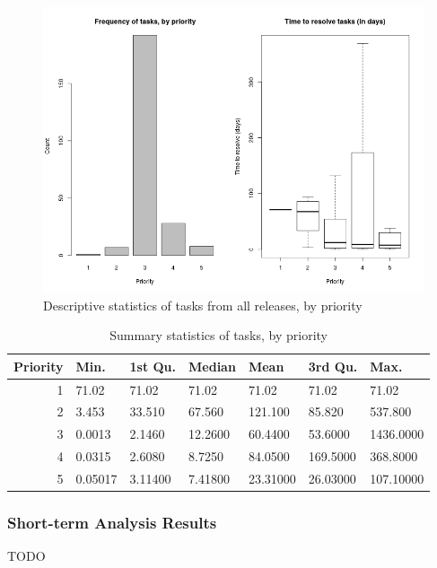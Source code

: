 \documentclass[a4paper]{scrartcl}
\begin{document}
\begin{figure}
\begin{center}
\includegraphics[width=6in]{exploratory_results/mongodb_allreleases/tasks}
\caption{Descriptive statistics of tasks from all releases, by priority}
\label{fig:all_tasks}
\end{center}
\end{figure}

\begin{table}[h!]
\caption{Summary statistics of tasks, by priority}
\centering
\begin{tabular}{ r | l | l | l | l |  l | l }
\hline
Priority & Min. & 1st Qu. & Median & Mean & 3rd Qu. & Max. \\
\hline\hline
1 & 71.02 & 71.02 & 71.02 & 71.02 & 71.02 & 71.02 \\
2 & 3.453 & 33.510 & 67.560 & 121.100 & 85.820 & 537.800 \\
3 & 0.0013 & 2.1460 & 12.2600 & 60.4400 & 53.6000 & 1436.0000 \\
4 & 0.0315 & 2.6080 & 8.7250 & 84.0500 & 169.5000 & 368.8000 \\
5 & 0.05017 & 3.11400 & 7.41800 & 23.31000 & 26.03000 & 107.10000 \\
\hline
\end{tabular}
\label{tab:all_tasks_summary}
\end{table}

\subsubsection{Short-term Analysis Results}
TODO
\end{document}
